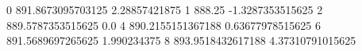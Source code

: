 0 891.8673095703125 2.28857421875
1 888.25 -1.3287353515625
2 889.5787353515625 0.0
4 890.2155151367188 0.63677978515625
6 891.5689697265625 1.990234375
8 893.9518432617188 4.37310791015625
